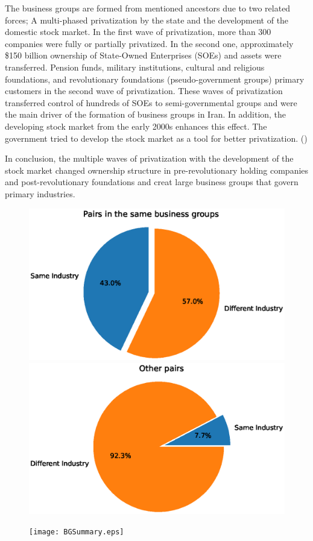 \documentclass[12pt, a4paper]{article}
\begin{document}
The business groups are formed from mentioned ancestors due to two related forces; A multi-phased privatization by the state and the development of the domestic stock market. In the first wave of privatization, more than 300 companies were fully or partially privatized. In the second one, approximately  \$150 billion ownership of State-Owned Enterprises (SOEs) and assets were transferred.  
Pension funds, military institutions, cultural and religious foundations, and revolutionary foundations (pseudo-government groups) primary customers in the second wave of privatization. These waves of privatization transferred control of hundreds of SOEs to
semi-governmental groups and were the main driver of the formation of business groups in Iran. In addition, the developing stock market from the early 2000s enhances this effect. The government tried to develop the stock market as a tool for better privatization. 
(\cite{Aliabadi2022})

In conclusion, the multiple waves of privatization with the development of the stock market changed ownership structure in pre-revolutionary holding companies and post-revolutionary foundations and creat large business groups that govern primary  industries.



\begin{figure}[htbp]
	\caption{}
	\label{sameIndustryinBG}
	\centering
	\includegraphics[width=0.48\linewidth]{sameIndustryinBG.eps}
	\includegraphics[width=0.48\linewidth]{sameIndustryNoinBG.eps}
\end{figure}

\begin{figure}[htbp]
	\caption{}
	\label{BGSummary}
	\centering
	\texttt{[image: BGSummary.eps]}
\end{figure}
\FloatBarrier
\end{document}
